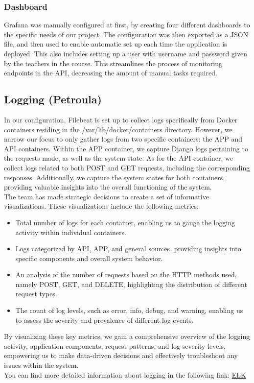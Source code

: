 \documentclass{article}
\begin{document}
\subsubsection{Dashboard}
Grafana was manually configured at first, by creating four different dashboards to the specific needs of our project. The configuration was then exported as a JSON file, and then used to enable automatic set up each time the application is deployed. This also includes setting up a user with username and password given by the teachers in the course. This streamlines the process of monitoring endpoints in the API, decreasing the amount of manual tasks required.

    \subsection{Logging (Petroula)}
        In our configuration, Filebeat is set up to collect logs specifically from Docker containers residing in the /var/lib/docker/containers directory. However, we narrow our focus to only gather logs from two specific containers: the APP and API containers. Within the APP container, we capture Django logs pertaining to the requests made, as well as the system state. As for the API container, we collect logs related to both POST and GET requests, including the corresponding responses. Additionally, we capture the system states for both containers, providing valuable insights into the overall functioning of the system.\\
        The team has made strategic decisions to create a set of informative visualizations. These visualizations include the following metrics:
        \begin{itemize}
            \item Total number of logs for each container, enabling us to gauge the logging activity within individual containers.
            \item Logs categorized by API, APP, and general sources, providing insights into specific components and overall system behavior.
            \item An analysis of the number of requests based on the HTTP methods used, namely POST, GET, and DELETE, highlighting the distribution of different request types.
            \item The count of log levels, such as error, info, debug, and warning, enabling us to assess the severity and prevalence of different log events.
        \end{itemize}
        By visualizing these key metrics, we gain a comprehensive overview of the logging activity, application components, request patterns, and log severity levels, empowering us to make data-driven decisions and effectively troubleshoot any issues within the system.\\
        You can find more detailed information about logging in the following link:  \href{https://github.com/szymongalecki/ITU-MiniTwit/blob/main/dev_notes/logging.md}{ELK}
\end{document}
